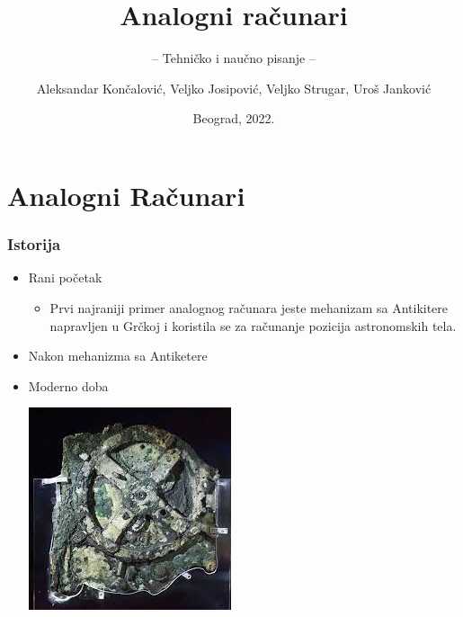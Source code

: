 \documentclass[14pt]{beamer}
\title{Analogni računari}
\subtitle{-- Tehničko i naučno pisanje --}
\author{Aleksandar Končalović, Veljko Josipović, Veljko Strugar, Uroš Janković}
\institute{Matematički fakultet\\Univerzitet u Beogradu}
\date{
	\footnotesize{Beograd, 2022.}	
}
\begin{document}
\begin{frame}
	\thispagestyle{empty}
	\titlepage
\end{frame}

\addtocounter{framenumber}{-1}

\section{Analogni Računari}
\begin{frame}[fragile]\frametitle{Istorija}
	\begin{itemize}
		\item Rani početak
		\begin{itemize}
			\item Prvi najraniji primer analognog računara jeste mehanizam sa Antikitere napravljen u Grčkoj i koristila se za računanje pozicija astronomskih tela.
		\end{itemize}
	\end{itemize}
\begin{itemize}
	\item Nakon mehanizma sa Antiketere
    \item Moderno doba
	\begin{itemize}
	\end{itemize}
 \begin{center}
\includegraphics[scale=0.5]{MehanizamSaAntiketere.jpg}
\end{center}
\end{itemize}
\end{frame}
\end{document}
